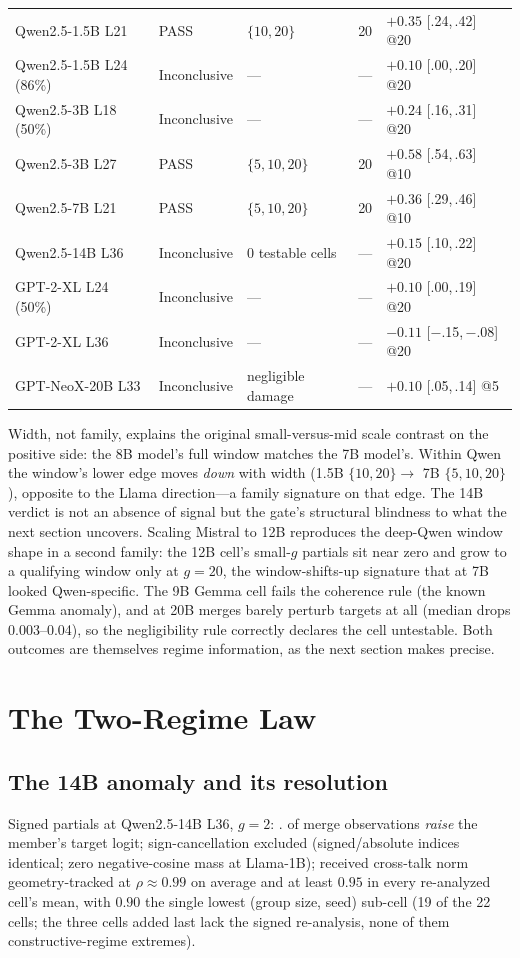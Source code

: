 \documentclass[preprint,12pt]{elsarticle}
\begin{document}
\begin{table}[htbp]
{\begin{tabular}{lllll}
Qwen2.5-1.5B L21 & PASS & $\{10,20\}$ & 20 & $+0.35$ {\scriptsize[.24,\,.42]} @20 \\
Qwen2.5-1.5B L24 (86\%) & Inconclusive & --- & --- & $+0.10$ {\scriptsize[.00,\,.20]} @20 \\
Qwen2.5-3B L18 (50\%) & Inconclusive & --- & --- & $+0.24$ {\scriptsize[.16,\,.31]} @20 \\
Qwen2.5-3B L27 & PASS & $\{5,10,20\}$ & 20 & $+0.58$ {\scriptsize[.54,\,.63]} @10 \\
Qwen2.5-7B L21   & PASS & $\{5,10,20\}$ & 20 & $+0.36$ {\scriptsize[.29,\,.46]} @10 \\
Qwen2.5-14B L36  & Inconclusive & 0 testable cells & --- & $+0.15$ {\scriptsize[.10,\,.22]} @20 \\
GPT-2-XL L24 (50\%) & Inconclusive & --- & --- & $+0.10$ {\scriptsize[.00,\,.19]} @20 \\
GPT-2-XL L36 & Inconclusive & --- & --- & $-0.11$ {\scriptsize[$-$.15,\,$-$.08]} @20 \\
GPT-NeoX-20B L33 & Inconclusive & negligible damage & --- & $+0.10$ {\scriptsize[.05,\,.14]} @5 \\
\bottomrule
\end{tabular}
}
\end{table}

Width, not family, explains the original small-versus-mid scale contrast on the positive
side: the 8B model's full window matches the 7B model's. Within Qwen the window's lower edge
moves \emph{down} with width (1.5B $\{10,20\}\to$ 7B $\{5,10,20\}$), opposite to the Llama
direction---a family signature on that edge. The 14B verdict is not an absence of signal but
the gate's structural blindness to what the next section uncovers. Scaling Mistral to 12B
reproduces the deep-Qwen window shape in a second family: the 12B cell's small-$g$ partials
sit near zero and grow to a qualifying window only at $g{=}20$, the window-shifts-up
signature that at 7B looked Qwen-specific. The 9B Gemma cell fails the coherence rule (the
known Gemma anomaly), and at 20B merges barely perturb targets at all (median drops
0.003--0.04), so the negligibility rule correctly declares the cell untestable. Both
outcomes are themselves regime information, as the next section makes precise.

\section{The Two-Regime Law}\label{sec:law}
\subsection{The 14B anomaly and its resolution}
Signed partials at Qwen2.5-14B L36, $g{=}2$: \fourteenBPartialsGtwo{}.
\fourteenBConstructiveRange{} of merge observations \emph{raise} the member's target
logit; sign-cancellation excluded (signed/absolute indices identical; zero
negative-cosine mass at Llama-1B); received cross-talk norm geometry-tracked at
$\rho\approx0.99$ on average and at least $0.95$ in every re-analyzed cell's mean, with
$0.90$ the single lowest (group size, seed) sub-cell (19 of the 22 cells; the three cells
added last lack the signed re-analysis, none of them constructive-regime extremes).
\end{document}
